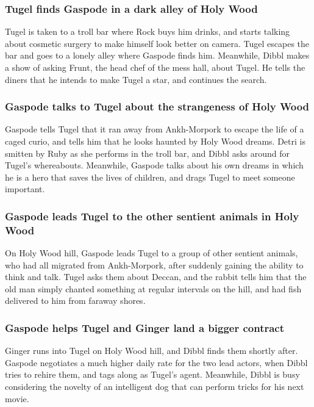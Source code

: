 \subsubsection{\Gls{Tugel} finds \Gls{Gaspode} in a dark alley of Holy Wood}
\Gls{Tugel} is taken to a troll bar where \Gls{Rock} buys him drinks, and starts talking about
cosmetic surgery to make himself look better on camera. \Gls{Tugel} escapes the bar and goes to a
lonely alley where \Gls{Gaspode} finds him. Meanwhile, \Gls{Dibbl} makes a show of asking
\Gls{Frunt}, the head chef of the mess hall, about \Gls{Tugel}. He tells the diners that he intends
to make \Gls{Tugel} a star, and continues the search.

\subsubsection{\Gls{Gaspode} talks to \Gls{Tugel} about the strangeness of Holy Wood}
\Gls{Gaspode} tells \Gls{Tugel} that it ran away from Ankh-Morpork to escape the life of a caged
curio, and tells him that he looks haunted by Holy Wood dreams. \Gls{Detri} is smitten by \Gls{Ruby}
as she performs in the troll bar, and \Gls{Dibbl} asks around for \Gls{Tugel}'s whereabouts.
Meanwhile, \Gls{Gaspode} talks about his own dreams in which he is a hero that saves the lives of
children, and drags \Gls{Tugel} to meet someone important.

\subsubsection{\Gls{Gaspode} leads \Gls{Tugel} to the other sentient animals in Holy Wood}
On Holy Wood hill, \Gls{Gaspode} leads \Gls{Tugel} to a group of other sentient animals, who had
all migrated from Ankh-Morpork, after suddenly gaining the ability to think and talk. \Gls{Tugel}
asks them about \Gls{Deccan}, and the rabbit tells him that the old man simply chanted something
at regular intervals on the hill, and had fish delivered to him from faraway shores.

\subsubsection{\Gls{Gaspode} helps \Gls{Tugel} and \Gls{Ginger} land a bigger contract}
\Gls{Ginger} runs into \Gls{Tugel} on Holy Wood hill, and \Gls{Dibbl} finds them shortly after.
\Gls{Gaspode} negotiates a much higher daily rate for the two lead actors, when \Gls{Dibbl} tries
to rehire them, and tags along as \Gls{Tugel}'s agent. Meanwhile, \Gls{Dibbl} is busy considering
the novelty of an intelligent dog that can perform tricks for his next movie.

